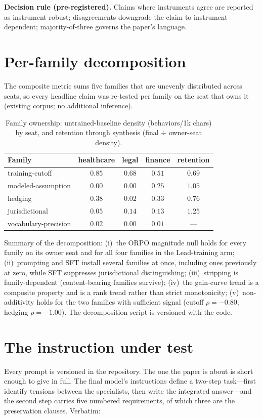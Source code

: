 \documentclass[11pt]{article}
\begin{document}
\textbf{Decision rule (pre-registered).} Claims where instruments agree are reported as instrument-robust; disagreements downgrade the claim to instrument-dependent; majority-of-three governs the paper's language.

\section{Per-family decomposition}
\label{app:family}
The composite metric sums five families that are unevenly distributed across
seats, so every headline claim was re-tested per family on the seat that owns
it (existing corpus; no additional inference).

\begin{table}[h]
\centering
\caption{Family ownership: untrained-baseline density (behaviors/1k chars) by
seat, and retention through synthesis (final $\div$ owner-seat density).}
\begin{tabular}{lcccc}
\toprule
Family & healthcare & legal & finance & retention \\
\midrule
training-cutoff & $0.85$ & $0.68$ & $0.51$ & $0.69$ \\
modeled-assumption & $0.00$ & $0.00$ & $\mathbf{0.25}$ & $1.05$ \\
hedging & $\mathbf{0.38}$ & $0.02$ & $0.33$ & $0.76$ \\
jurisdictional & $0.05$ & $\mathbf{0.14}$ & $0.13$ & $1.25$ \\
vocabulary-precision & $0.02$ & $0.00$ & $0.01$ & --- \\
\bottomrule
\end{tabular}
\end{table}

Summary of the decomposition: (i)~the ORPO magnitude null holds for every
family on its owner seat and for all four families in the Lead-training arm;
(ii)~prompting and SFT install several families at once, including ones
previously at zero, while SFT suppresses jurisdictional distinguishing;
(iii)~stripping is family-dependent (content-bearing families survive);
(iv)~the gain-curve trend is a composite property and is a rank trend rather than strict monotonicity; (v)~non-additivity holds
for the two families with sufficient signal (cutoff $\rho=-0.80$, hedging
$\rho=-1.00$). The decomposition script is versioned with the code.

\section{The instruction under test}
\label{app:prompts}
Every prompt is versioned in the repository. The one the paper is about is
short enough to give in full. The final model's instructions define a two-step
task---first identify tensions between the specialists, then write the
integrated answer---and the second step carries five numbered requirements, of
which three are the preservation clauses. Verbatim:
\end{document}
